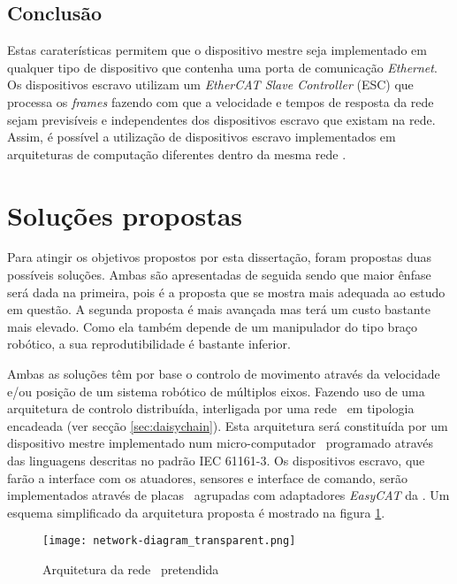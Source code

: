 \subsection{Conclusão}
Estas caraterísticas permitem que o dispositivo mestre seja implementado
em qualquer tipo de dispositivo que contenha uma porta de comunicação 
\emph{Ethernet}. Os dispositivos escravo utilizam um \emph{EtherCAT Slave
Controller} (ESC) que processa os \emph{frames} fazendo com que a velocidade
e tempos de resposta da rede sejam previsíveis e independentes dos 
dispositivos escravo que existam na rede. Assim, é possível a utilização
de dispositivos escravo implementados em arquiteturas de computação
diferentes dentro da mesma rede \ecat.


\section{Soluções propostas} \label{sec:solution}

Para atingir os objetivos propostos por esta dissertação, foram propostas 
duas possíveis soluções. Ambas são apresentadas de seguida sendo que
maior ênfase será dada na primeira, pois é a proposta que se mostra mais
adequada ao estudo em questão. A segunda proposta é mais avançada mas
terá um custo bastante mais elevado. Como ela também depende de um manipulador
do tipo braço robótico, a sua reprodutibilidade é bastante inferior.

Ambas as soluções têm por base o controlo de movimento através da velocidade
e/ou posição de um sistema robótico de múltiplos eixos. Fazendo uso de
uma arquitetura de controlo distribuída, interligada por uma rede \ecat\
em tipologia encadeada (ver secção \ref{sec:daisychain}). Esta arquitetura
será constituída por um dispositivo mestre implementado num micro-computador
\raspi\, programado através das linguagens descritas no padrão
IEC 61161-3. Os dispositivos escravo, que farão a interface com os atuadores,
sensores e interface de comando, serão implementados através de placas
\arduino\ agrupadas com adaptadores \emph{EasyCAT} da \cite{ABT:EasyCAT}.
Um esquema simplificado da arquitetura proposta é mostrado na figura
\ref{fig:network-architecture}.

\begin{figure}[htb]
 \centering
 \texttt{[image: network-diagram\_transparent.png]}
 \caption{Arquitetura da rede \ecat\ pretendida}
 \label{fig:network-architecture}
\end{figure}


